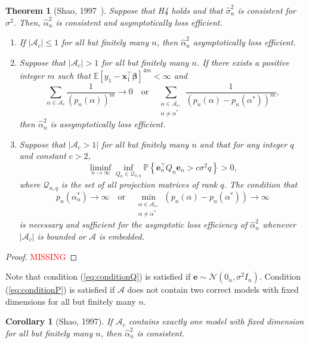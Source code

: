 \documentclass[12pt, letter paper]{article}
\newcommand{\1}{\mathmybb{1}}
\newtheorem{theorem}[proposition]{Theorem}
\newtheorem{corollary}[proposition]{Corollary}
\newcommand{\0}{\emptyset}
\newcommand{\prob}{\mathbb{P}}
\newcommand{\Ep}[1]{\mathbb{E}\left[ #1 \right]}
\newcommand{\paren}[1]{\left(#1 \right)}
\newcommand{\set}[1]{\left\{ #1 \right\}}
\newcommand{\Acal}{\mathcal{A}}
\newcommand{\Ncal}{\mathcal{N}}
\newcommand{\x}{\boldsymbol{x}}
\newcommand{\e}{\boldsymbol{e}}
\newcommand{\bbeta}{\boldsymbol{\beta}}
\newcommand{\alphahat}[1]{\hat{\alpha}^{#1}}
\newcommand{\sigmahat}{\hat{\sigma}^{2}_{n}}
\begin{document}
\begin{theorem}[Shao, 1997~\cite{shao_1997}]\label{prop:97thm1}
    Suppose that H4 holds and that \(\sigmahat\) is consistent for \(\sigma^{2}\). Then, \(\alphahat{2}_{n}\) is consistent and asymptotically loss efficient.
    \begin{enumerate}
        \item If \(|\Acal_{c}|\leq1\) for all but finitely many \(n\), then \(\alphahat{2}_{n}\) asymptotically loss efficient.
        \item Suppose that \(|\Acal_{c}|> 1\) for all but finitely many \(n\). If there exists a positive integer \(m\) such that \(\Ep{y_{1} - \x_{1}^{\top}\bbeta}^{4m}<\infty\) and 
        \begin{equation}
            \sum_{\alpha\in\Acal_{c}}\frac{1}{\paren{p_{n}(\alpha)}^{m}}\to 0 \quad\text{or}\quad \sum_{\substack{\alpha\in\Acal_{c},\\ \alpha\neq\alpha^{*}}}\frac{1}{\paren{p_{n}(\alpha) - p_{n}(\alpha^{*})}^{m}},
        \end{equation}
        then \(\alphahat{2}_{n}\) is assymptotically loss efficient.
        \item Suppose that \(|\Acal_{c}>1|\) for all but finitely many \(n\) and that for any integer \(q\) and constant \(c>2\), 
        \begin{equation}
            \label{eq:conditionQ}
            \liminf_{n\to\infty}\inf_{Q_{n}\in\mathcal{Q}_{n,q}}\prob\set{\e_{n}^{\top}Q_{n}\e_{n} > c\sigma^{2}q} > 0,
        \end{equation}
        where \(\mathcal{Q}_{n,q}\) is the set of all projection matrices of rank \(q\). The condition that
        \begin{equation}
            \label{eq:conditionP}
            p_{n}(\alpha^{*}_{n})\to\infty\quad\text{or}\quad \min_{\substack{\alpha\in\Acal_{c},\\ \alpha\neq\alpha^{*}}}\paren{p_{n}(\alpha) - p_{n}(\alpha^{*})}\to\infty
        \end{equation}
        is necessary and sufficient for the asymptotic loss efficiency of \(\alphahat{2}_{n}\) whenever \(|\Acal_{c}|\) is bounded or \(\Acal\) is embedded.
    \end{enumerate}
\end{theorem}

\begin{proof}
    \textcolor{red}{MISSING}
\end{proof}

Note that condition (\ref{eq:conditionQ}) is satisfied if \(\e\sim\Ncal(0_{n}, \sigma^{2}I_{n})\). Condition (\ref{eq:conditionP}) is satisfied if \(\Acal\) does not contain two correct models with fixed dimensions for all but finitely many \(n\).
\begin{corollary}[Shao, 1997]
    If \(\Acal_{c}\) contains exactly one model with fixed dimension for all but finitely many \(n\), then \(\alphahat{2}_{n}\) is consistent.
\end{corollary}
\end{document}
